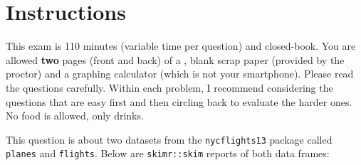 \documentclass[12pt]{article}
\begin{document}
\section*{Instructions}
This exam is 110 minutes (variable time per question) and closed-book. You are allowed \textbf{two} pages (front and back) of a , blank scrap paper (provided by the proctor) and a graphing calculator (which is not your smartphone). Please read the questions carefully. Within each problem, I recommend considering the questions that are easy first and then circling back to evaluate the harder ones. No food is allowed, only drinks. %

\pagebreak


\problem This question is about two datasets from the \texttt{nycflights13} package called \texttt{planes} and \texttt{flights}. Below are \texttt{skimr::skim} reports of both data frames:
\end{document}
